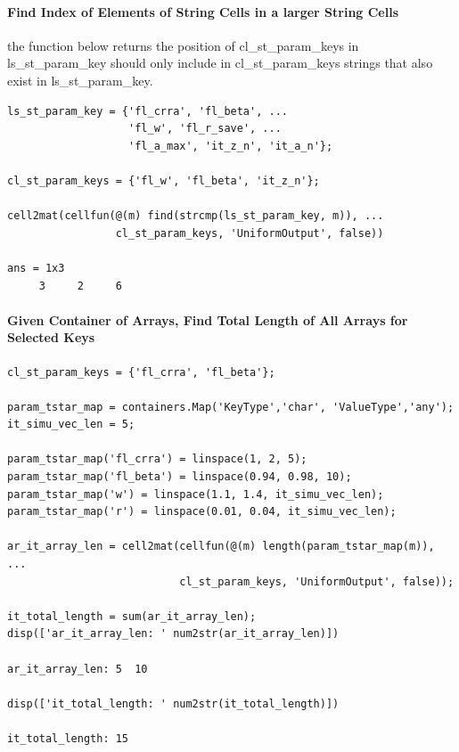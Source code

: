 \documentclass[
]{book}
\begin{document}
\hypertarget{find-index-of-elements-of-string-cells-in-a-larger-string-cells}{%
\paragraph{Find Index of Elements of String Cells in a larger String Cells}\label{find-index-of-elements-of-string-cells-in-a-larger-string-cells}}

the function below returns the position of cl\_st\_param\_keys in
ls\_st\_param\_key should only include in cl\_st\_param\_keys strings
that also exist in ls\_st\_param\_key.

\begin{verbatim}
ls_st_param_key = {'fl_crra', 'fl_beta', ...
                   'fl_w', 'fl_r_save', ...
                   'fl_a_max', 'it_z_n', 'it_a_n'};

cl_st_param_keys = {'fl_w', 'fl_beta', 'it_z_n'};

cell2mat(cellfun(@(m) find(strcmp(ls_st_param_key, m)), ...
                 cl_st_param_keys, 'UniformOutput', false))

ans = 1x3    
     3     2     6
\end{verbatim}

\hypertarget{given-container-of-arrays-find-total-length-of-all-arrays-for-selected-keys}{%
\paragraph{Given Container of Arrays, Find Total Length of All Arrays for Selected Keys}\label{given-container-of-arrays-find-total-length-of-all-arrays-for-selected-keys}}

\begin{verbatim}
cl_st_param_keys = {'fl_crra', 'fl_beta'};

param_tstar_map = containers.Map('KeyType','char', 'ValueType','any');
it_simu_vec_len = 5;

param_tstar_map('fl_crra') = linspace(1, 2, 5);
param_tstar_map('fl_beta') = linspace(0.94, 0.98, 10);
param_tstar_map('w') = linspace(1.1, 1.4, it_simu_vec_len);
param_tstar_map('r') = linspace(0.01, 0.04, it_simu_vec_len);

ar_it_array_len = cell2mat(cellfun(@(m) length(param_tstar_map(m)), ...
                           cl_st_param_keys, 'UniformOutput', false));

it_total_length = sum(ar_it_array_len);
disp(['ar_it_array_len: ' num2str(ar_it_array_len)])

ar_it_array_len: 5  10

disp(['it_total_length: ' num2str(it_total_length)])

it_total_length: 15
\end{verbatim}
\end{document}
